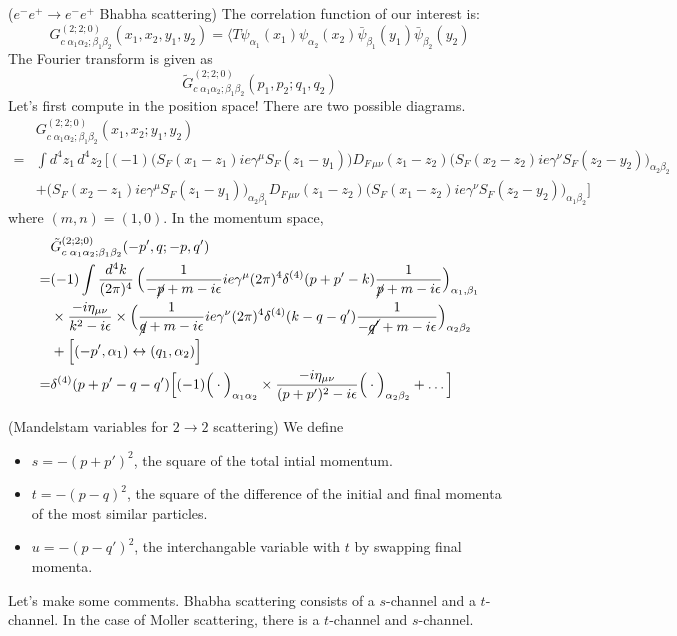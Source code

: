 \begin{ex}
($e^{-}e^{+}\rightarrow e^{-}e^{+}$ Bhabha scattering) The correlation function of our interest is:
\[G^{(2;2;0)}_{c\;\alpha_1\alpha_2;\beta_1\beta_2}(x_1,x_2,y_1,y_2)=\langle T\psi _{\alpha_1}(x_1)\psi _{\alpha_2}(x_2)\bar{\psi }_{\beta_1}(y_1)\bar{\psi }_{\beta_2}(y_2)\]
The Fourier transform is given as
\[\tilde{G}^{(2;2;0)}_{c\;\alpha_1\alpha_2;\beta_1\beta_2}(p_1,p_2;q_1,q_2)\]
Let's first compute in the position space! There are two possible diagrams.
\[\begin{align*}
&G^{(2;2;0)}_{c\;\alpha_1\alpha_2;\beta_1\beta_2}(x_1,x_2;y_1,y_2)\\=&\int d^{4}z_1\,d^{4}z_2\,\Big[(-1)\Big(S_{F}(x_1-z_1)ie\gamma ^{\mu }S_{F}(z_1-y_1)\Big)D_{F\,\mu \nu }(z_1-z_2)\Big(S_{F}(x_2-z_2)ie\gamma ^{\nu }S_{F}(z_2-y_2)\Big)_{\alpha_2\beta_2}\\&+\Big(S_{F}(x_2-z_1)ie\gamma ^{\mu }S_{F}(z_1-y_1)\Big)_{\alpha_2\beta_1}D_{F\,\mu \nu }(z_1-z_2)\Big(S_{F}(x_1-z_2)ie\gamma ^{\nu }S_{F}(z_2-y_2)\Big)_{\alpha_1\beta_2}\Big]
\end{align*}\]
where $(m,n)=(1,0)$. In the momentum space,
\[\begin{align*}
&\tilde{G}^{(2;2;0)}_{c\;\alpha_1\alpha_2;\beta_1\beta_2}(-p',q;-p,q')\\
=&(-1)\int \dfrac{d^{4}k}{(2\pi )^{4}}\,\Big(\dfrac{1}{-\cancel{p}+m-i\epsilon }ie\gamma ^{\mu }(2\pi )^{4}\delta ^{(4)}(p+p'-k)\dfrac{1}{\cancel{p}+m-i\epsilon }\Big)_{\alpha_1,\beta_1}\\
&\times \dfrac{-i\eta _{\mu \nu }}{k^2-i\epsilon }\times \Big(\dfrac{1}{\cancel{q}+m-i\epsilon }ie\gamma ^{\nu }(2\pi )^{4}\delta ^{(4)}(k-q-q')\dfrac{1}{-\cancel{q'}+m-i\epsilon }\Big)_{\alpha_2 \beta_2 }\\
&+\Big[(-p',\alpha_1)\leftrightarrow (q_1,\alpha_2)\Big]\\
=&\delta ^{(4)}(p+p'-q-q')\Big[(-1)\Big(\cdot \Big)_{\alpha_1\alpha_2}\times \dfrac{-i\eta _{\mu \nu }}{(p+p')^2-i\epsilon }\Big(\cdot \Big)_{\alpha_2\beta_2}+\ldots \Big]
\end{align*}\]
\end{ex}
\vspace{2ex}
\begin{defi}
(Mandelstam variables for $2\rightarrow 2$ scattering) We define
\begin{itemize}
\item[(i)] $s=-(p+p')^2$, the square of the total intial momentum.
\item[(ii)] $t=-(p-q)^2$, the square of the difference of the initial and final momenta of the most similar particles.
\item[(iii)] $u=-(p-q')^2$, the interchangable variable with $t$ by swapping final momenta. 
\end{itemize}
Let's make some comments. Bhabha scattering consists of a $s$-channel and a $t$-channel. In the case of Moller scattering, there is a $t$-channel and $s$-channel.
\end{defi}

